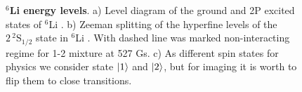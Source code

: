 \begin{figure}
    \caption{
        \textbf{${}^6$Li energy levels}. 
        a) Level diagram of the ground and 2P excited states of ${}^6$Li \cite{gehm_preparation_2003}. 
        b) Zeeman splitting of the hyperfine levels of the $2\, {}^2\mathrm{S}_{1/2}$ state in ${}^6$Li \cite{serwane_deterministic_2011, sibalic_arc_2017}. With dashed line was marked non-interacting regime for 1-2 mixture at 527 Gs. c) As different spin states for physics we consider state $\left| 1 \right\rangle$ and $\left| 2 \right\rangle$, but for imaging it is worth to flip them to close transitions.
    }
    \label{fig:li6levels}
\end{figure}